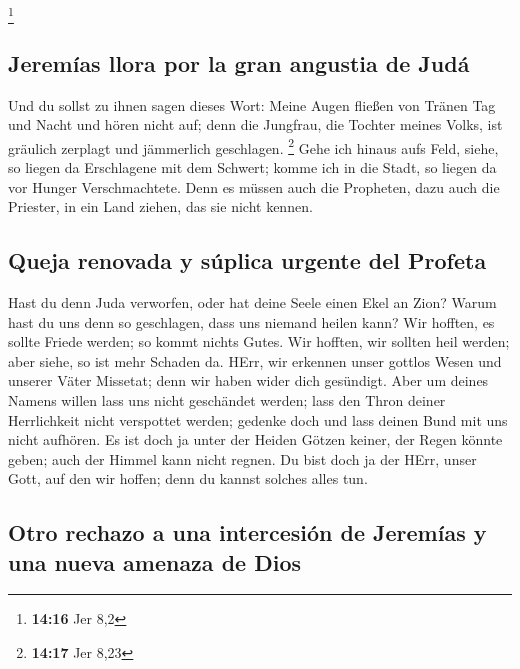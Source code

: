 \footnote{\textbf{14:16} Jer 8,2}

\hypertarget{jeremuxedas-llora-por-la-gran-angustia-de-juduxe1}{%
\subsection{Jeremías llora por la gran angustia de
Judá}\label{jeremuxedas-llora-por-la-gran-angustia-de-juduxe1}}

 Und du sollst zu ihnen sagen dieses Wort: Meine Augen
fließen von Tränen Tag und Nacht und hören nicht auf; denn die Jungfrau,
die Tochter meines Volks, ist gräulich zerplagt und jämmerlich
geschlagen. \footnote{\textbf{14:17} Jer 8,23}  Gehe ich
hinaus aufs Feld, siehe, so liegen da Erschlagene mit dem Schwert; komme
ich in die Stadt, so liegen da vor Hunger Verschmachtete. Denn es müssen
auch die Propheten, dazu auch die Priester, in ein Land ziehen, das sie
nicht kennen.

\hypertarget{queja-renovada-y-suxfaplica-urgente-del-profeta}{%
\subsection{Queja renovada y súplica urgente del
Profeta}\label{queja-renovada-y-suxfaplica-urgente-del-profeta}}

 Hast du denn Juda verworfen, oder hat deine Seele einen
Ekel an Zion? Warum hast du uns denn so geschlagen, dass uns niemand
heilen kann? Wir hofften, es sollte Friede werden; so kommt nichts
Gutes. Wir hofften, wir sollten heil werden; aber siehe, so ist mehr
Schaden da.  HErr, wir erkennen unser gottlos Wesen und
unserer Väter Missetat; denn wir haben wider dich gesündigt.
 Aber um deines Namens willen lass uns nicht geschändet
werden; lass den Thron deiner Herrlichkeit nicht verspottet werden;
gedenke doch und lass deinen Bund mit uns nicht aufhören.
 Es ist doch ja unter der Heiden Götzen keiner, der Regen
könnte geben; auch der Himmel kann nicht regnen. Du bist doch ja der
HErr, unser Gott, auf den wir hoffen; denn du kannst solches alles tun.

\hypertarget{otro-rechazo-a-una-intercesiuxf3n-de-jeremuxedas-y-una-nueva-amenaza-de-dios}{%
\subsection{Otro rechazo a una intercesión de Jeremías y una nueva
amenaza de
Dios}\label{otro-rechazo-a-una-intercesiuxf3n-de-jeremuxedas-y-una-nueva-amenaza-de-dios}}

